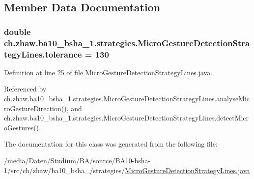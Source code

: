 \subsection{Member Data Documentation}
\hypertarget{classch_1_1zhaw_1_1ba10__bsha__1_1_1strategies_1_1MicroGestureDetectionStrategyLines_a05159d73fbedc92c3e806f38b1ac4c7d}{
\subsubsection[{tolerance}]{\setlength{\rightskip}{0pt plus 5cm}double {\bf ch.zhaw.ba10\_\-bsha\_\-1.strategies.MicroGestureDetectionStrategyLines.tolerance} = 130}}
\label{classch_1_1zhaw_1_1ba10__bsha__1_1_1strategies_1_1MicroGestureDetectionStrategyLines_a05159d73fbedc92c3e806f38b1ac4c7d}


Definition at line 25 of file MicroGestureDetectionStrategyLines.java.

Referenced by ch.zhaw.ba10\_\-bsha\_\-1.strategies.MicroGestureDetectionStrategyLines.analyseMicroGestureDirection(), and ch.zhaw.ba10\_\-bsha\_\-1.strategies.MicroGestureDetectionStrategyLines.detectMicroGestures().

The documentation for this class was generated from the following file:\begin{DoxyCompactItemize}
\item 
/media/Daten/Studium/BA/source/BA10-\/bsha-\/1/src/ch/zhaw/ba10\_\-bsha\_/strategies/\hyperlink{MicroGestureDetectionStrategyLines_8java}{MicroGestureDetectionStrategyLines.java}\end{DoxyCompactItemize}
